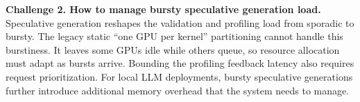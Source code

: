
\noindent\textbf{Challenge 2. How to manage bursty speculative generation load.}
Speculative generation reshapes the validation and profiling load from sporadic to bursty.
The legacy static ``one GPU per kernel'' partitioning cannot handle this burstiness.
It leaves some GPUs idle while others queue, so resource allocation must adapt as bursts arrive.
Bounding the profiling feedback latency also requires request prioritization.
For local LLM deployments, bursty speculative generations further introduce
additional memory overhead that the system needs to manage.

